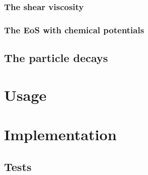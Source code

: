 \documentclass[12pt, a4paper]{report}
\begin{document}
	\section{The shear viscosity}
	\section{The EoS with chemical potentials}
	
	\chapter{The particle decays}
\part{Usage}

\part{Implementation}
\chapter{Tests}
\end{document}
